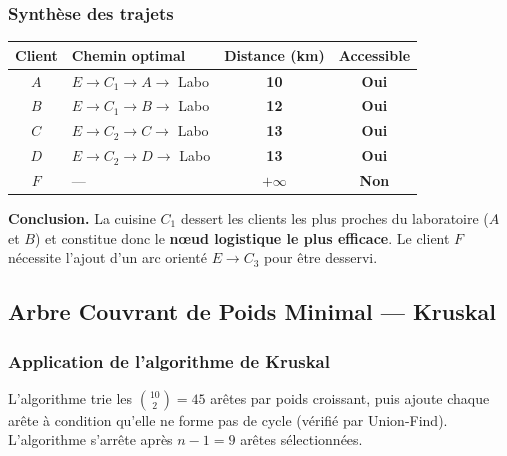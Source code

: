\documentclass[12pt,a4paper]{article}
\begin{document}
\subsubsection{Synthèse des trajets}

\begin{center}\small
\setlength{\tabcolsep}{8pt}
\renewcommand{\arraystretch}{1.2}
\begin{tabular}{clcc}
\arrayrulecolor{SlateMid}
\toprule
\rowcolor{NavyDark}
{\color{white}\textbf{Client}} &
{\color{white}\textbf{Chemin optimal}} &
{\color{white}\textbf{Distance (km)}} &
{\color{white}\textbf{Accessible}}\\
\midrule
$A$ & $E\to C_1\to A\to$ Labo & \textbf{10} & \textcolor{AccentTeal}{\textbf{Oui}}\\
\rowcolor{SlateLight}
$B$ & $E\to C_1\to B\to$ Labo & \textbf{12} & \textcolor{AccentTeal}{\textbf{Oui}}\\
$C$ & $E\to C_2\to C\to$ Labo & \textbf{13} & \textcolor{AccentTeal}{\textbf{Oui}}\\
\rowcolor{SlateLight}
$D$ & $E\to C_2\to D\to$ Labo & \textbf{13} & \textcolor{AccentTeal}{\textbf{Oui}}\\
$F$ & — & $+\infty$ & \textcolor{AccentRed}{\textbf{Non}}\\
\bottomrule
\end{tabular}
\end{center}

\begin{resultbox}
\textbf{Conclusion.} La cuisine $C_1$ dessert les clients les plus proches du
laboratoire ($A$ et $B$) et constitue donc le \textbf{nœud logistique le plus
efficace}. Le client $F$ nécessite l'ajout d'un arc orienté $E \to C_3$ pour
être desservi.
\end{resultbox}

\newpage

\subsection{Arbre Couvrant de Poids Minimal — Kruskal}

\subsubsection{Application de l'algorithme de Kruskal}

L'algorithme trie les $\binom{10}{2}=45$ arêtes par poids croissant, puis ajoute chaque
arête à condition qu'elle ne forme pas de cycle (vérifié par Union-Find). L'algorithme
s'arrête après $n-1 = 9$ arêtes sélectionnées.
\end{document}
